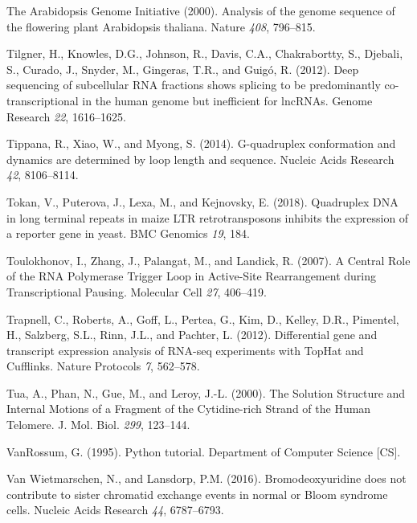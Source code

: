 \documentclass[12pt,a4paper,]{report}
\begin{document}
\leavevmode\hypertarget{ref-Initiative2000}{}%
The Arabidopsis Genome Initiative (2000). Analysis of the genome
sequence of the flowering plant Arabidopsis thaliana. Nature \emph{408},
796--815.

\leavevmode\hypertarget{ref-Tilgner2012}{}%
Tilgner, H., Knowles, D.G., Johnson, R., Davis, C.A., Chakrabortty, S.,
Djebali, S., Curado, J., Snyder, M., Gingeras, T.R., and Guigó, R.
(2012). Deep sequencing of subcellular RNA fractions shows splicing to
be predominantly co-transcriptional in the human genome but inefficient
for lncRNAs. Genome Research \emph{22}, 1616--1625.

\leavevmode\hypertarget{ref-Tippana2014}{}%
Tippana, R., Xiao, W., and Myong, S. (2014). G-quadruplex conformation
and dynamics are determined by loop length and sequence. Nucleic Acids
Research \emph{42}, 8106--8114.

\leavevmode\hypertarget{ref-Tokan2018}{}%
Tokan, V., Puterova, J., Lexa, M., and Kejnovsky, E. (2018). Quadruplex
DNA in long terminal repeats in maize LTR retrotransposons inhibits the
expression of a reporter gene in yeast. BMC Genomics \emph{19}, 184.

\leavevmode\hypertarget{ref-Toulokhonov2007}{}%
Toulokhonov, I., Zhang, J., Palangat, M., and Landick, R. (2007). A
Central Role of the RNA Polymerase Trigger Loop in Active-Site
Rearrangement during Transcriptional Pausing. Molecular Cell \emph{27},
406--419.

\leavevmode\hypertarget{ref-Trapnell2012}{}%
Trapnell, C., Roberts, A., Goff, L., Pertea, G., Kim, D., Kelley, D.R.,
Pimentel, H., Salzberg, S.L., Rinn, J.L., and Pachter, L. (2012).
Differential gene and transcript expression analysis of RNA-seq
experiments with TopHat and Cufflinks. Nature Protocols \emph{7},
562--578.

\leavevmode\hypertarget{ref-Tua2000}{}%
Tua, A., Phan, N., Gue, M., and Leroy, J.-L. (2000). The Solution
Structure and Internal Motions of a Fragment of the Cytidine-rich Strand
of the Human Telomere. J. Mol. Biol. \emph{299}, 123--144.

\leavevmode\hypertarget{ref-VanRossum1995}{}%
VanRossum, G. (1995). Python tutorial. Department of Computer Science
{[}CS{]}.

\leavevmode\hypertarget{ref-VanWietmarschen2016}{}%
Van Wietmarschen, N., and Lansdorp, P.M. (2016). Bromodeoxyuridine does
not contribute to sister chromatid exchange events in normal or Bloom
syndrome cells. Nucleic Acids Research \emph{44}, 6787--6793.
\end{document}
